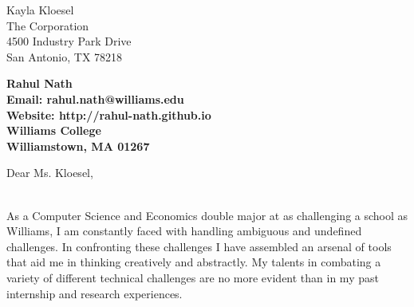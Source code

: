 \documentclass[11pt]{letter} %
\newcommand{\forceindent}{\leavevmode{\parindent=24pt\indent}}
\begin{document}

\begin{letter}{Kayla Kloesel \\
The Corporation \\
4500 Industry Park Drive \\
San Antonio, TX 78218} 


\begin{center}
\large\bf Rahul Nath \\ %
Email: rahul.nath@williams.edu \\ Website: http://rahul-nath.github.io \\ Williams College \\ Williamstown, MA 01267
\end{center}
\vfill


\opening{Dear Ms. Kloesel,}\\
\forceindent As a Computer Science and Economics double major at as challenging a school as Williams, I am constantly faced with handling ambiguous and undefined challenges. In confronting these challenges I have assembled an arsenal of tools that aid me in thinking creatively and abstractly. My talents in combating a variety of different technical challenges are no more evident than in my past internship and research experiences. \\


\end{letter}
\end{document}
